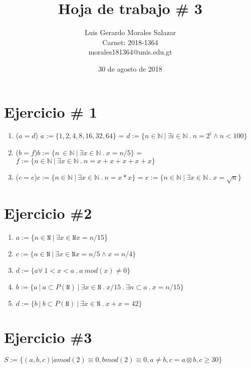 \documentclass{article}
\title{Hoja de trabajo \# 3}
\author{Luis Gerardo Morales Salazar \\Carnet: 2018-1364\\ morales181364@unis.edu.gt}
\date{30 de agosto de 2018}
\begin{document}
\maketitle
\section{Ejercicio \# 1}

\begin{enumerate}
\item{($a=d$) $a:=\{1,2,4,8,16,32,64\}$} = {$d:=\{n\in\mathbb{N}\ |\ \exists i\in\mathbb{N}\ .\ n=2^i\wedge n<100 \}$}
\item{($b=f$)$b:=\{n\ \in \mathbb{N}\ |\ \exists x \in \mathbb{N}\ .\ x=n/5 \}$} = {$f:=\{ n\in\mathbb{N}\ |\ \exists x\in \mathbb{N}\ .\ n=x+x+x+x+x \}$}
\item{($c=e$)$c:=\{n\in \mathbb{N}\ |\ \exists x\in\mathbb{N}\ .\ n=x*x \}$} = {$e:=\{ n\in\mathbb{N}\ |\ \exists x\in \mathbb{N}\ .\ x=\sqrt{n} \}$}
\end{enumerate}

\section{Ejercicio \#2}
\begin{enumerate}
    \item {$a:=\{n \in \mathtt{N} \ |\ \exists x \in \mathtt{N} x= n/15 $\}}
    \item {$c:= \{ n \in \mathtt{N} \ |\  \exists x \in \mathtt{N} x= n/5 \wedge x = n/4 \} $}
     \item {$d:= \{ a \forall \ 1 < x < a \ . \ a \ mod(x) \neq 0 \} $}
    \item {$b :=\{ a \ |\ a\subset P(\mathtt{N}) \ |\ \exists x \in \mathtt{N} \ .\ x/15 \ .\ \exists n \subset a \ .\ x=n/15\} $}
    \item {$d :=\{ b \ |\ b\subset P(\mathtt{N}) \ |\ \exists x \in \mathtt{N} \ .\ x + x = 42\} $}
\end{enumerate}

\section{Ejercicio \#3}
$S:= \{(a,b,c)| amod(2) \equiv 0, bmod(2) \equiv 0, a \not= b, c = a \otimes b, c \geq 30 \}$
\end{document}
